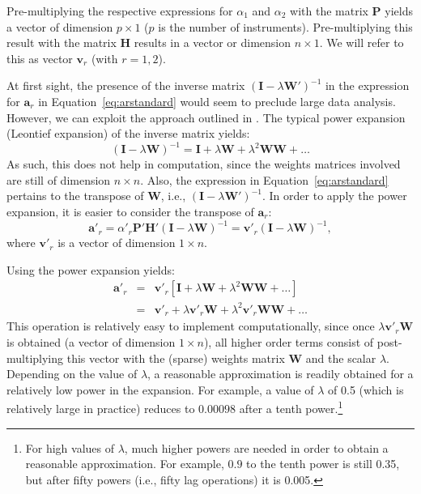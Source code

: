 \documentclass{article}
\begin{document}
Pre-multiplying the respective expressions for $\alpha_1$ and $\alpha_2$ with the
matrix $\mathbf{P}$ yields a vector of dimension $p \times 1$ ($p$ is the number of
instruments). Pre-multiplying this result with the matrix $\mathbf{H}$ results in a 
vector or dimension $n \times 1$. We will refer to this as vector $\mathbf{v}_r$ (with
$r = 1,2$).


At first sight, the presence of the inverse matrix $( \mathbf{I} - \lambda \mathbf{W'})^{-1}$ in the expression for $\mathbf{a}_r$ in Equation~\ref{eq:arstandard} would seem to preclude large data
analysis. However, we can exploit the approach outlined in \cite{Smirnov:05}. The typical
power expansion (Leontief expansion) of the inverse matrix yields:
\begin{equation*}
 ( \mathbf{I} - \lambda \mathbf{W})^{-1} = \mathbf{I} + \lambda \mathbf{W} + \lambda^2 \mathbf{WW} + \dots
\end{equation*}
As such, this does not help in computation, since the weights matrices involved are still
of dimension $n \times n$. Also, the expression in Equation~\ref{eq:arstandard} pertains to
the transpose of $\mathbf{W}$, i.e., $( \mathbf{I} - \lambda \mathbf{W'} )^{-1}$. In order
to apply the power expansion, it is easier to consider the transpose of $\mathbf{a}_r$:
\begin{equation}
\mathbf{a'}_r = \alpha'_r \mathbf{P'} \mathbf{H'} (\mathbf{I} - \lambda \mathbf{W} )^{-1} = \mathbf{v'}_r (\mathbf{I} - \lambda \mathbf{W} )^{-1},
\end{equation}
where $\mathbf{v'}_r$ is a vector of dimension $1 \times n$.

Using the power expansion yields:
\begin{eqnarray*}
\mathbf{a'}_r &=& \mathbf{v'}_r [  \mathbf{I} + \lambda \mathbf{W} + \lambda^2 \mathbf{WW} + \dots ]\\
  &=& \mathbf{v'}_r + \lambda \mathbf{v'}_r  \mathbf{W}    +\lambda^2  \mathbf{v'}_r  \mathbf{W }\mathbf{W}   + \dots
\end{eqnarray*}
This operation is relatively easy to implement computationally, since once $\lambda \mathbf{v'}_r  \mathbf{W}$ is obtained (a vector of dimension $1 \times n$), all higher order terms consist of
post-multiplying this vector with the (sparse) weights matrix $\mathbf{W}$ and the scalar $\lambda$.
Depending on the
value of $\lambda$, a reasonable approximation is readily obtained for a
relatively low power in the expansion.
For example, a value of $\lambda$ of 0.5 (which is relatively large in practice) reduces to
$0.00098$ after a tenth power.\footnote{For high values of $\lambda$, much higher powers
are needed in order to obtain a reasonable approximation. For example, $0.9$ to the tenth power is still 0.35, but
after fifty powers (i.e., fifty lag operations) it is 0.005.}
\end{document}
